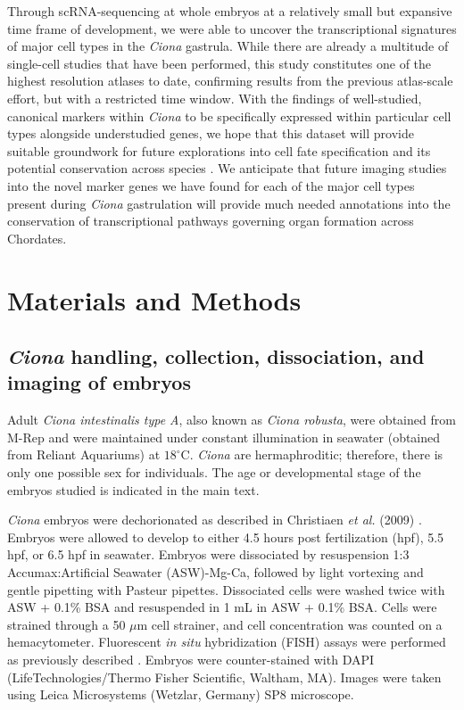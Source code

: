 Through scRNA-sequencing at whole embryos at a relatively small but expansive time frame of development, we were able to uncover the transcriptional signatures of major cell types in the \textit{Ciona} gastrula. While there are already a multitude of single-cell studies that have been performed, this study constitutes one of the highest resolution atlases to date, confirming results from the previous atlas-scale effort, but with a restricted time window. With the findings of well-studied, canonical markers within \textit{Ciona} to be specifically expressed within particular cell types alongside understudied genes, we hope that this dataset will provide suitable groundwork for future explorations into cell fate specification and its potential conservation across species \cite{winkley2021,sladitschek2020,zhang2020,ilsley2020,wang2019,horie2018,wang2021,cao2019}. We anticipate that future imaging studies into the novel marker genes we have found for each of the major cell types present during \textit{Ciona} gastrulation will provide much needed annotations into the conservation of transcriptional pathways governing organ formation across Chordates. 

\section{Materials and Methods}

\subsection{\textit{Ciona} handling, collection, dissociation, and imaging of embryos}
Adult \textit{Ciona intestinalis type A}, also known as \textit{Ciona robusta}, were obtained from M-Rep and were maintained under constant illumination in seawater (obtained from Reliant Aquariums) at $18^\circ$C. \textit{Ciona} are hermaphroditic; therefore, there is only one possible sex for individuals. The age or developmental stage of the embryos studied is indicated in the main text.

\textit{Ciona} embryos were dechorionated as described in Christiaen \textit{et al.} (2009) \cite{christiaen2009}. Embryos were allowed to develop to either 4.5 hours post fertilization (hpf), 5.5 hpf, or 6.5 hpf in seawater. Embryos were dissociated by resuspension 1:3 Accumax:Artificial Seawater (ASW)-Mg-Ca, followed by light vortexing and gentle pipetting with Pasteur pipettes. Dissociated cells were washed twice with ASW + 0.1\% BSA and resuspended in 1 mL in ASW + 0.1\% BSA. Cells were strained through a 50 $\mu$m cell strainer, and cell concentration was counted on a hemacytometer. Fluorescent \textit{in situ} hybridization (FISH) assays were performed as previously described \cite{beh2007,ikuta2007,christiaen2009a,stolfi2014}. Embryos were counter-stained with DAPI (LifeTechnologies/Thermo Fisher Scientific, Waltham, MA). Images were taken using Leica Microsystems (Wetzlar, Germany) SP8 microscope.

